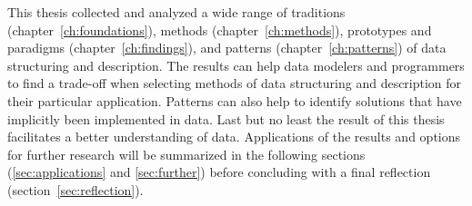 
This thesis collected and analyzed a wide range of traditions
(chapter~\ref{ch:foundations}), methods (chapter~\ref{ch:methods}), prototypes
and paradigms (chapter~\ref{ch:findings}), and patterns
(chapter~\ref{ch:patterns}) of data structuring and description. The results
can help data modelers and programmers to find a trade-off when selecting
methods of data structuring and description for their particular application.
Patterns can also help to identify solutions that have implicitly been
implemented in data. Last but no least the result of this thesis facilitates a
better understanding of data. Applications of the results and options for
further research will be summarized in the following sections
(\ref{sec:applications} and \ref{sec:further}) before concluding with a final
reflection (section~\ref{sec:reflection}).


